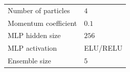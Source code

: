\documentclass{article}
\begin{document}
\begin{table}
{{\begin{tabular}{@{}ll@{}}
Number of particles                                                        & $4$                                                                          \\
Momentum coefficient                                                       & $0.1$                                                                          \\
MLP hidden size                                                                & $256$                                                                          \\
MLP activation                                                                 & ELU/RELU
                                        \\
Ensemble size                                                                  & $5$                                                                          \\ \bottomrule
\end{tabular}%
}
}
\vspace{-0.1in}
\end{table}
\end{document}
